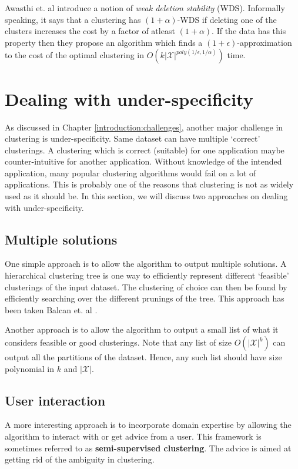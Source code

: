 \documentclass[letterpaper,12pt,titlepage,oneside,final]{book}
\newcommand{\mc}{\mathcal}
\begin{document}
Awasthi et. al \cite{awasthi2010stability} introduce a notion of \textit{weak deletion stability} (WDS). Informally speaking, it says that a clustering has $(1+\alpha)$-WDS if deleting one of the clusters increases the cost by a factor of atleast $(1+\alpha)$. If the data has this property then they propose an algorithm which finds a $(1+\epsilon)$-approximation to the cost of the optimal clustering in $O(k |\mc X|^{poly(1/\epsilon , 1/\alpha)})$ time. 

\section{Dealing with under-specificity}
As discussed in Chapter \ref{introduction:challenges}, another major challenge in clustering is under-specificity. Same dataset can have multiple `correct' clusterings. A clustering which is correct (suitable) for one application maybe counter-intuitive for another application. Without knowledge of the intended application, many popular clustering algorithms would fail on a lot of applications. This is probably one of the reasons that clustering is not as widely used as it should be.  In this section, we will discuss two approaches on dealing with under-specificity. 

\subsection{Multiple solutions} 
One simple approach is to allow the algorithm to output multiple solutions. A hierarchical clustering tree is one way to efficiently represent different `feasible' clusterings of the input dataset. The clustering of choice can then be found by efficiently searching over the different prunings of the tree. This approach has been taken Balcan et. al \cite{balcan2012clustering}. 

Another approach is to allow the algorithm to output a small list of what it considers feasible or good clusterings. Note that any list of size $O(|\mc X|^k)$ can output all the partitions of the dataset. Hence, any such list should have size polynomial in $k$ and $|\mc X|$.
   
\subsection{User interaction}
A more interesting approach is to incorporate domain expertise by allowing the algorithm to interact with or get advice from a user. This framework is sometimes referred to as \textbf{semi-supervised clustering}. The advice is aimed at getting rid of the ambiguity in clustering. 
\end{document}
